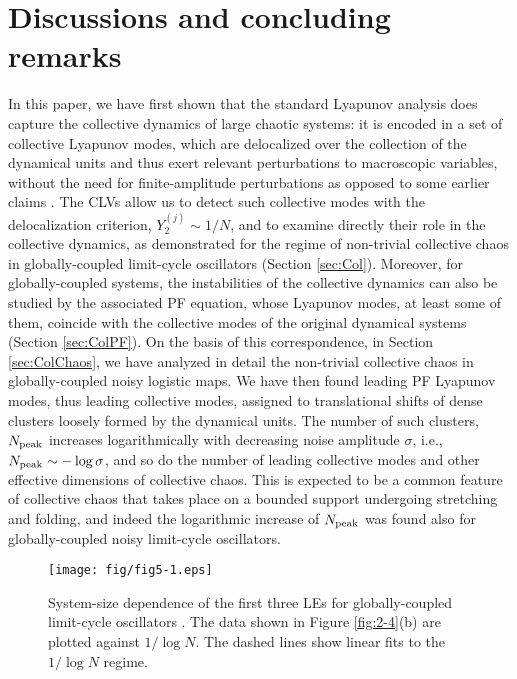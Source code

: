\documentclass[12pt]{iopart}
\begin{document}
\section{Discussions and concluding remarks}  \label{sec:Dis}

In this paper, we have first shown that
 the standard Lyapunov analysis does capture
 the collective dynamics of large chaotic systems:
 it is encoded in a set of collective Lyapunov modes,
 which are delocalized over the collection of the dynamical units
 and thus exert relevant perturbations to macroscopic variables,
 without the need for finite-amplitude perturbations
 as opposed to some earlier claims
 \cite{Shibata.Kaneko-PRL1998,Cencini.etal-PD1999}.
The CLVs allow us to detect such collective modes
 with the delocalization criterion, $Y_2^{(j)} \sim 1/N$,
 and to examine directly their role in the collective dynamics,
 as demonstrated for the regime of non-trivial collective chaos
 in globally-coupled limit-cycle oscillators (Section \ref{sec:Col}).
Moreover, for globally-coupled systems,
 the instabilities of the collective dynamics can also be studied
 by the associated PF equation,
 whose Lyapunov modes, at least some of them, coincide
 with the collective modes of the original dynamical systems
 (Section \ref{sec:ColPF}).
On the basis of this correspondence,
 in Section \ref{sec:ColChaos},
 we have analyzed in detail the non-trivial collective chaos
 in globally-coupled noisy logistic maps.
We have then found leading PF Lyapunov modes,
 thus leading collective modes,
 assigned to translational shifts of dense clusters
 loosely formed by the dynamical units.
The number of such clusters, $N_{\rm peak}$ increases logarithmically
 with decreasing noise amplitude $\sigma$,
 i.e., $N_{\rm peak} \sim -\log\sigma$,
 and so do the number of leading collective modes
 and other effective dimensions of collective chaos.
This is expected to be a common feature of collective chaos
 that takes place on a bounded support undergoing stretching and folding,
 and indeed the logarithmic increase of $N_{\rm peak}$ was found
also for globally-coupled noisy limit-cycle oscillators.

\begin{figure}[t]
 \begin{center}
  \texttt{[image: fig/fig5-1.eps]}
  \caption{System-size dependence of the first three LEs for globally-coupled limit-cycle oscillators . The data shown in Figure \ref{fig:2-4}(b) are plotted against $1/\log N$. The dashed lines show linear fits to the $1/\log N$ regime.}
  \label{fig:5-1}
 \end{center}
\end{figure}%
\end{document}
